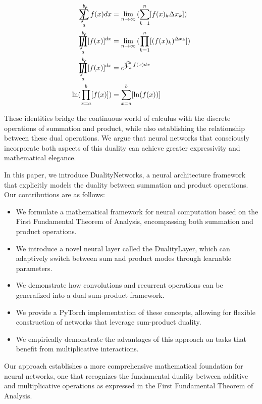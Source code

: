 \documentclass{article}
\DeclareMathOperator*{\SumInt}{%
\mathchoice%
  {\ooalign{$\displaystyle\sum$\cr\hidewidth$\displaystyle\int$\hidewidth\cr}}
  {\ooalign{\raisebox{.14\height}{\scalebox{.7}{$\textstyle\sum$}}\cr\hidewidth$\textstyle\int$\hidewidth\cr}}
  {\ooalign{\raisebox{.2\height}{\scalebox{.6}{$\scriptstyle\sum$}}\cr$\scriptstyle\int$\cr}}
  {\ooalign{\raisebox{.2\height}{\scalebox{.6}{$\scriptstyle\sum$}}\cr$\scriptstyle\int$\cr}}
}
\DeclareMathOperator*{\ProdInt}{%
\mathchoice%
  {\ooalign{$\displaystyle\prod$\cr\hidewidth$\displaystyle\int$\hidewidth\cr}}
  {\ooalign{\raisebox{.14\height}{\scalebox{.7}{$\textstyle\prod$}}\cr\hidewidth$\textstyle\int$\hidewidth\cr}}
  {\ooalign{\raisebox{.2\height}{\scalebox{.6}{$\scriptstyle\prod$}}\cr$\scriptstyle\int$\cr}}
  {\ooalign{\raisebox{.2\height}{\scalebox{.6}{$\scriptstyle\prod$}}\cr$\scriptstyle\int$\cr}}
}
\begin{document}
\begin{align}
\SumInt_{a}^{b} f(x) dx &= \lim_{n \to \infty}{(\sum_{k=1}^{n} [f(x)_{k}\Delta x_{k}])} \label{eq:sum_integral} \\
\ProdInt_{a}^{b} [f(x)]^{dx} &= \lim_{n \to \infty}{(\prod_{k=1}^{n} [(f(x)_{k})^{\Delta x_{k}}])} \label{eq:prod_integral} \\
\ProdInt_{a}^{b} [f(x)]^{dx} &= e^{\SumInt_{a}^{b} f(x) dx} \label{eq:prod_sum_conversion} \\
\ln(\prod_{x=a}^{b} [f(x)]) &= \sum_{x=a}^{b} [\ln(f(x))] \label{eq:discrete_conversion}
\end{align}

These identities bridge the continuous world of calculus with the discrete operations of summation and product, while also establishing the relationship between these dual operations. We argue that neural networks that consciously incorporate both aspects of this duality can achieve greater expressivity and mathematical elegance.

In this paper, we introduce DualityNetworks, a neural architecture framework that explicitly models the duality between summation and product operations. Our contributions are as follows:

\begin{itemize}
    \item We formulate a mathematical framework for neural computation based on the First Fundamental Theorem of Analysis, encompassing both summation and product operations.
    
    \item We introduce a novel neural layer called the DualityLayer, which can adaptively switch between sum and product modes through learnable parameters.
    
    \item We demonstrate how convolutions and recurrent operations can be generalized into a dual sum-product framework.
    
    \item We provide a PyTorch implementation of these concepts, allowing for flexible construction of networks that leverage sum-product duality.
    
    \item We empirically demonstrate the advantages of this approach on tasks that benefit from multiplicative interactions.
\end{itemize}

Our approach establishes a more comprehensive mathematical foundation for neural networks, one that recognizes the fundamental duality between additive and multiplicative operations as expressed in the First Fundamental Theorem of Analysis.
\end{document}
